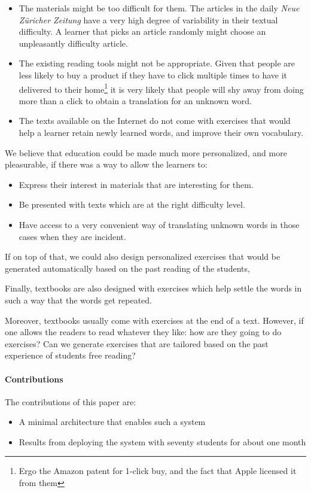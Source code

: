 \begin{itemize}
	
  \item The materials might be too difficult for them. The articles in the  daily {\em Neue Z\"uricher Zeitung} have a very high degree of variability in their textual difficulty. A learner that picks an article randomly might choose an unpleasantly difficulty article.

  \item The existing reading tools might not be appropriate. Given that people are less likely to buy a product if they have to click multiple times to have it delivered to their home\footnote{Ergo the Amazon patent for 1-click buy, and the fact that Apple licensed it from them} it is very likely that people will shy away from doing more than a click to obtain a translation for an unknown word.

  \item The texts available on the Internet do not come with exercises that would help a learner retain newly learned words, and improve their own vocabulary. 
  
\end{itemize}

We believe that education could be made much more personalized, and more pleasurable, if there was a way to allow the learners to:
\begin{itemize}
\item Express their interest in materials that are interesting for them.
\item Be presented with texts which are at the right difficulty level.
\item Have access to a very convenient way of translating unknown words in those cases when they are incident.
\end{itemize}

If on top of that, we could also design personalized exercises that would be generated automatically based on the past reading of the students,

Finally, textbooks are also designed with exercises which help settle the words in such a way that the words get repeated.

Moreover, textbooks usually come with exercises at the end of a text. However, if one allows the readers to read whatever they like: how are they going to do exercises? Can we generate exercises that are tailored based on the past experience of students free reading?

\paragraph{Contributions}
The contributions of this paper are: 
\begin{itemize}
	\item A minimal architecture that enables such a system
	\item Results from deploying the system with seventy students for about one month
\end{itemize}

